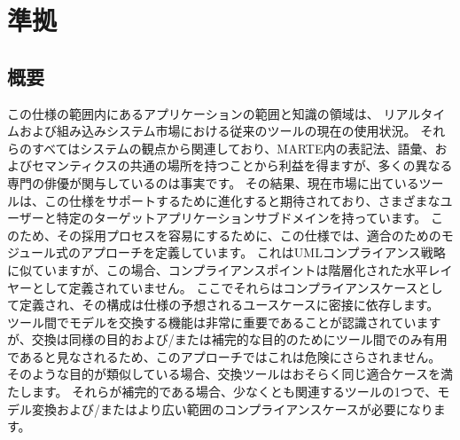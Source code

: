 \section{準拠}	%

\subsection{概要}	%


この仕様の範囲内にあるアプリケーションの範囲と知識の領域は、
リアルタイムおよび組み込みシステム市場における従来のツールの現在の使用状況。
それらのすべてはシステムの観点から関連しており、MARTE内の表記法、語彙、およびセマンティクスの共通の場所を持つことから利益を得ますが、多くの異なる専門の俳優が関与しているのは事実です。
その結果、現在市場に出ているツールは、この仕様をサポートするために進化すると期待されており、さまざまなユーザーと特定のターゲットアプリケーションサブドメインを持っています。
このため、その採用プロセスを容易にするために、この仕様では、適合のためのモジュール式のアプローチを定義しています。
これはUMLコンプライアンス戦略に似ていますが、この場合、コンプライアンスポイントは階層化された水平レイヤーとして定義されていません。
ここでそれらはコンプライアンスケースとして定義され、その構成は仕様の予想されるユースケースに密接に依存します。
ツール間でモデルを交換する機能は非常に重要であることが認識されていますが、交換は同様の目的および/または補完的な目的のためにツール間でのみ有用であると見なされるため、このアプローチではこれは危険にさらされません。
そのような目的が類似している場合、交換ツールはおそらく同じ適合ケースを満たします。
それらが補完的である場合、少なくとも関連するツールの1つで、モデル変換および/またはより広い範囲のコンプライアンスケースが必要になります。

